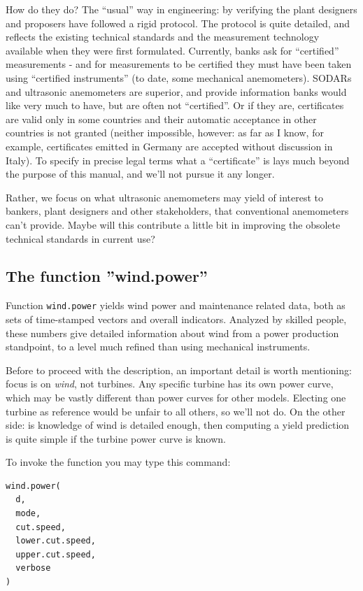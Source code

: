\documentclass[a4paper,10pt]{book}
\begin{document}
How do they do? The ``usual'' way in engineering: by verifying the plant designers and proposers have followed a rigid protocol. The protocol is quite detailed, and reflects the existing technical standards and the measurement technology available when they were first formulated. Currently, banks ask for ``certified'' measurements - and for measurements to be certified they must have been taken using ``certified instruments'' (to date, some mechanical anemometers). SODARs and ultrasonic anemometers are superior, and provide information banks would like very much to have, but are often not ``certified''. Or if they are, certificates are valid only in some countries and their automatic acceptance in other countries is not granted (neither impossible, however: as far as I know, for example, certificates emitted in Germany are accepted without discussion in Italy). To specify in precise legal terms what a ``certificate'' is lays much beyond the purpose of this manual, and we'll not pursue it any longer.

Rather, we focus on what ultrasonic anemometers may yield of interest to bankers, plant designers and other stakeholders, that conventional anemometers can't provide. Maybe will this contribute a little bit in improving the obsolete technical standards in current use?

\subsection{The function ''wind.power''}

Function \verb|wind.power| yields wind power and maintenance related data, both as sets of time-stamped vectors and overall indicators. Analyzed by skilled people, these numbers give detailed information about wind from a power production standpoint, to a level much refined than using mechanical instruments.

Before to proceed with the description, an important detail is worth mentioning: focus is on \emph{wind}, not turbines. Any specific turbine has its own power curve, which may be vastly different than power curves for other models. Electing one turbine as reference would be unfair to all others, so we'll not do. On the other side: is knowledge of wind is detailed enough, then computing a yield prediction is quite simple if the turbine power curve is known.

To invoke the function you may type this command:

\begin{verbatim}
wind.power(
  d,
  mode,
  cut.speed,
  lower.cut.speed,
  upper.cut.speed,
  verbose
)
\end{verbatim}
\end{document}
